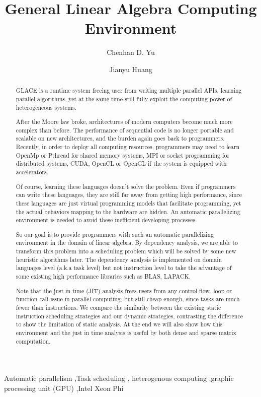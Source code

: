 \documentclass[preprint,11pt]{elsarticle}
\begin{document}
\begin{frontmatter}
  \title{General Linear Algebra Computing Environment}
  \author[a01]{Chenhan D. Yu} 
  \author[a01]{Jianyu Huang} 
  \address[a01]{Department of Computer Science, University of Texas at Austin}

  \begin{abstract}
  GLACE is a runtime system freeing user from writing multiple parallel APIs, 
  learning parallel algorithms, yet at the same time still fully exploit the computing power 
  of heterogeneous systems.
   
  After the Moore law broke, architectures of modern computers become much more 
  complex than before. The performance of sequential code is no longer portable and 
  scalable on new architectures, and the burden again goes back to programmers. 
  Recently, in order to deploy all computing resources, programmers may need to learn 
  OpenMp or Pthread for shared memory systems, MPI or socket programming for 
  distributed systems, CUDA, OpenCL or OpenGL if the system is equipped with 
  accelerators.
  
  Of course, learning these languages doesn't solve the problem. Even if programmers can 
  write these languages, they are still far away from getting high performance, since these 
  languages are just virtual programming models that facilitate programming, yet the actual 
  behaviors mapping to the hardware are hidden. An automatic parallelizing environment is 
  needed to avoid these inefficient developing processes.
  
  So our goal is to provide programmers with such an automatic parallelizing environment 
  in the domain of linear algebra. By dependency analysis, we are able to transform this 
  problem into a scheduling problem which will be solved by some new heuristic algorithms 
  later. The dependency analysis is implemented on domain languages level (a.k.a task 
  level) but not instruction level to take the advantage of some existing high performance 
  libraries such as BLAS, LAPACK.
  
  Note that the just in time (JIT) analysis frees users from any control flow, loop or function 
  call issue in parallel computing, but still cheap enough, since tasks are much fewer than 
  instructions. We compare the similarity between the existing static instruction scheduling 
  strategies and our dynamic strategies, contrasting the difference to show the limitation of 
  static analysis. At the end we will also show how this environment and the just in time 
  analysis is useful by both dense and sparse matrix computation.
  \end{abstract}
  \begin{keyword}
    Automatic parallelism \sep Task scheduling \sep
    heterogenous computing \sep graphic processing unit (GPU) \sep Intel Xeon Phi
  \end{keyword}
\end{frontmatter}
\end{document}
